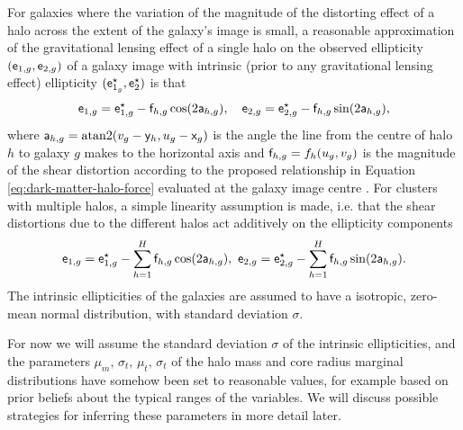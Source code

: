 For galaxies where the variation of the magnitude of the distorting effect of a halo across the extent of the galaxy's image is small, a reasonable approximation of the gravitational lensing effect of a single halo on the observed ellipticity $(\mathsf{e}_{1,g},\mathsf{e}_{2,g})$ of a galaxy image with intrinsic (prior to any gravitational lensing effect) ellipticity $(\mathsf{e}_{1_g}^\star, \mathsf{e}_2^\star)$ is that 
\begin{equation}\label{eq:obs-ellipticity-single-halo}
  \mathsf{e}_{1,g} = \mathsf{e}_{1,g}^\star - \mathsf{f}_{h,g} \cos(2 \mathsf{a}_{h,g}),
  \quad
  \mathsf{e}_{2,g} = \mathsf{e}_{2,g}^\star -  \mathsf{f}_{h,g} \sin(2 \mathsf{a}_{h,g}),
\end{equation}
where $\rvar{a}_{h,g} = \textrm{atan2}\lpa v_g - \rvar{y}_h, u_g - \rvar{x}_g\rpa$ is the angle the line from the centre of halo $h$ to galaxy $g$ makes to the horizontal axis and $\mathsf{f}_{h,g} = f_h(u_g, v_g)$ is the magnitude of the shear distortion according to the proposed relationship in Equation \eqref{eq:dark-matter-halo-force} evaluated at the galaxy image centre \citep{bartelmann2001weak}. For clusters with multiple halos, a simple linearity assumption is made, i.e. that the shear distortions due to the different halos act additively on the ellipticity components
\begin{equation}\label{eq:obs-ellipticity-multiple-halos}
  \mathsf{e}_{1,g} = \mathsf{e}_{1,g}^\star - \sum_{h=1}^H \mathsf{f}_{h,g} \cos(2 \mathsf{a}_{h,g}),
  ~
  \mathsf{e}_{2,g} = \mathsf{e}_{2,g}^\star -  \sum_{h=1}^H \mathsf{f}_{h,g} \sin(2 \mathsf{a}_{h,g}).
\end{equation}
The intrinsic ellipticities of the galaxies are assumed to have a isotropic, zero-mean normal distribution,  with standard deviation $\sigma$.

For now we will assume the standard deviation $\sigma$ of the intrinsic ellipticities, and the parameters $\mu_m,\,\sigma_t,\,\mu_t,\,\sigma_t$ of the halo mass and core radius marginal distributions have somehow been set to reasonable values, for example based on prior beliefs about the typical ranges of the variables. We will discuss possible strategies for inferring these parameters in more detail later.


